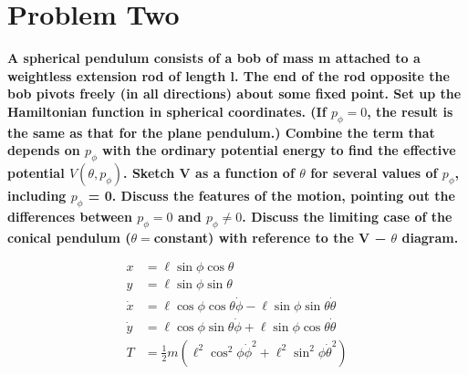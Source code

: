 \documentclass[10pt]{article} %
\begin{document}
\section{Problem Two}

\textbf{A spherical pendulum consists of a bob of mass m attached to a weightless extension rod of length l. The end of the rod opposite the bob pivots freely (in all directions) about some fixed point. Set up the Hamiltonian function in spherical coordinates. (If $p_{\phi}=0$, the result is the same as that for the plane pendulum.) Combine the term that depends on $p_{\phi}$ with the ordinary potential energy to find the effective potential $V(\theta,p_{\phi})$. Sketch V as a function of $\theta$ for several values of $p_{\phi}$, including $p_{\phi}$ = 0. Discuss the features of the motion, pointing out the differences between $p_{\phi}=0$ and $p_{\phi} \neq 0$. Discuss the limiting case of the conical pendulum ($\theta = $constant) with reference to the V − $\theta$ diagram.}

\begin{align*}
  x &= \ell\sin\phi\cos\theta\\
  y &= \ell\sin\phi\sin\theta\\
  \dot{x} &= \ell\cos\phi\cos\theta\dot{\phi} - \ell\sin\phi\sin\theta\dot{\theta}\\
  \dot{y} &= \ell\cos\phi\sin\theta\dot{\phi} + \ell\sin\phi\cos\theta\dot{\theta}\\
  T &= \frac{1}{2}m\left(\ell^2\cos^2\phi\dot{\phi}^2 + \ell^2\sin^2\phi\dot{\theta}^2\right)\\
\end{align*}
\end{document}
